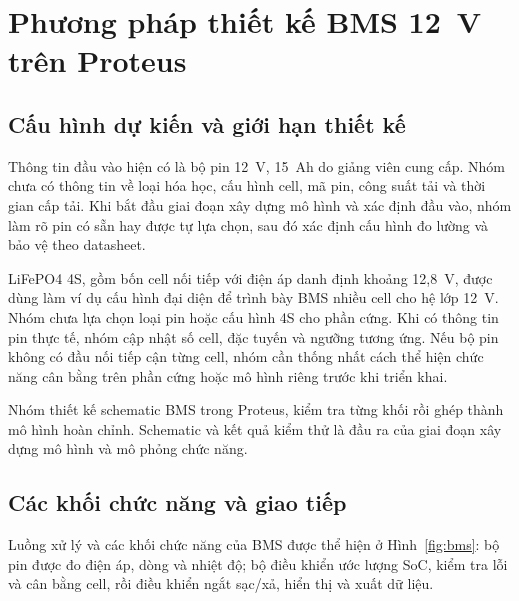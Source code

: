 \section{Phương pháp thiết kế BMS 12~V trên Proteus}
\label{sec:bms-design}

\subsection{Cấu hình dự kiến và giới hạn thiết kế}

Thông tin đầu vào hiện có là bộ pin 12~V, 15~Ah do giảng viên cung cấp. Nhóm chưa có thông tin về loại hóa học, cấu hình cell, mã pin, công suất tải và thời gian cấp tải. Khi bắt đầu giai đoạn xây dựng mô hình và xác định đầu vào, nhóm làm rõ pin có sẵn hay được tự lựa chọn, sau đó xác định cấu hình đo lường và bảo vệ theo datasheet.

LiFePO4 4S, gồm bốn cell nối tiếp với điện áp danh định khoảng 12,8~V, được dùng làm ví dụ cấu hình đại diện để trình bày BMS nhiều cell cho hệ lớp 12~V. Nhóm chưa lựa chọn loại pin hoặc cấu hình 4S cho phần cứng. Khi có thông tin pin thực tế, nhóm cập nhật số cell, đặc tuyến và ngưỡng tương ứng. Nếu bộ pin không có đầu nối tiếp cận từng cell, nhóm cần thống nhất cách thể hiện chức năng cân bằng trên phần cứng hoặc mô hình riêng trước khi triển khai.

Nhóm thiết kế schematic BMS trong Proteus, kiểm tra từng khối rồi ghép thành mô hình hoàn chỉnh. Schematic và kết quả kiểm thử là đầu ra của giai đoạn xây dựng mô hình và mô phỏng chức năng.

\subsection{Các khối chức năng và giao tiếp}

Luồng xử lý và các khối chức năng của BMS được thể hiện ở Hình~\ref{fig:bms}: bộ pin được đo điện áp, dòng và nhiệt độ; bộ điều khiển ước lượng SoC, kiểm tra lỗi và cân bằng cell, rồi điều khiển ngắt sạc/xả, hiển thị và xuất dữ liệu.

